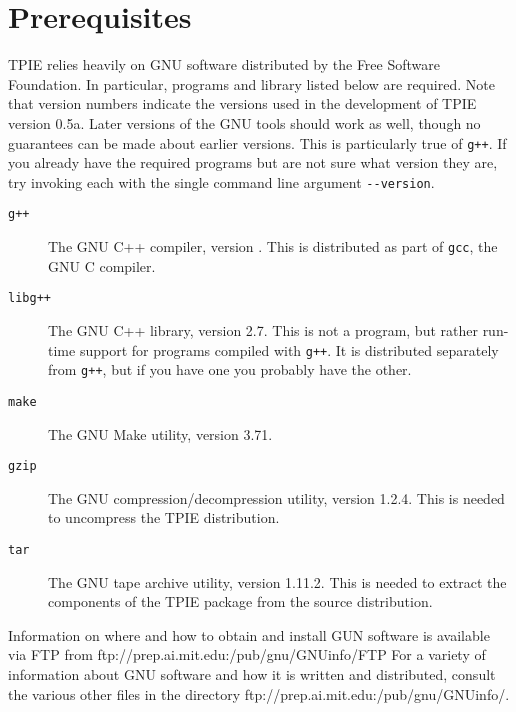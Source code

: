\section{Prerequisites}

\label{sec:gnu-software}

TPIE relies heavily on GNU software distributed by the Free Software
Foundation.  In particular, programs
and library listed below are required.  Note that version numbers
indicate the versions used in the development of TPIE version 0.5a.
Later versions of the GNU tools should work as well, though no
guarantees can be made about earlier versions.  This is particularly
true of \verb|g++|.  If you already have the required programs but are
not sure what version they are, try invoking each with the single
command line argument \verb|--version|.

\begin{description}
\item[\verb|g++|] The GNU C++ compiler,
  version \gxxversion.  This is distributed as part of \verb|gcc|, the GNU C
  compiler.
\item[\verb|libg++|] The GNU C++ library,
  version 2.7.  This is not a program, but rather run-time support for
  programs compiled with \verb|g++|.  It is distributed separately
  from \verb|g++|, but if you have one you probably have the other.
\item[\verb|make|] The GNU Make utility, 
  version 3.71.
\item[\verb|gzip|] The GNU compression/decompression utility, 
  version  1.2.4.  This is needed to uncompress the TPIE 
  distribution.
\item[\verb|tar|] The GNU tape archive utility, 
  version 1.11.2.  This
  is needed to extract the components of the TPIE package from the
  source distribution.
\end{description}

Information on where and how to obtain and install GUN software is
available via FTP from 
%
{ftp://prep.ai.mit.edu:/pub/gnu/GNUinfo/FTP}
For a variety of information about GNU software and how it is written
and distributed, 
consult the various other files in the directory
%
{ftp://prep.ai.mit.edu:/pub/gnu/GNUinfo/}.

